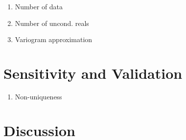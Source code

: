 \begin{enumerate}[noitemsep]
    \item Number of data
    \item Number of uncond. reals
    \item Variogram approximation
\end{enumerate}


\FloatBarrier
\section{Sensitivity and Validation}
\label{sec:valid}

\begin{enumerate}[noitemsep]
    \item Non-uniqueness
\end{enumerate}


\FloatBarrier
\section{Discussion}
\label{sec:discuss04}